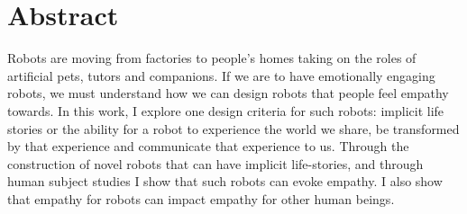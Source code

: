 \begingroup
\let\clearpage\relax
\let\cleardoublepage\relax
\let\cleardoublepage\relax

\chapter*{Abstract}

Robots are moving from factories to people's homes taking on the roles of artificial pets, tutors and companions. If we are to have emotionally engaging robots, we must understand how we can design robots that people feel empathy towards. In this work, I explore one design criteria for such robots: implicit life stories or the ability for a robot to experience the world we share, be transformed by that experience and communicate that experience to us. Through the construction of novel robots that can have implicit life-stories, and through human subject studies I show that such robots can evoke empathy. I also show that empathy for robots can impact empathy for other human beings. 

\endgroup			

\vfill